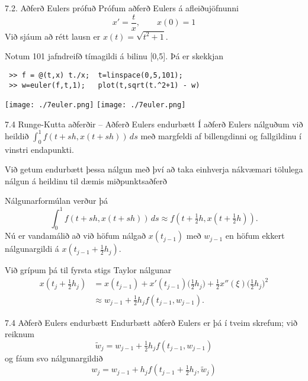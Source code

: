 \begin{frame}[fragile]{7.2. Aðferð Eulers prófuð}
Prófum aðferð Eulers á afleiðujöfnunni
$$
  x' = \frac tx, \qquad x(0) = 1
$$
Við sjáum að rétt lausn er $x(t) = \sqrt{t^2+ 1}$.\pause

Notum 101 jafndreifð tímagildi á bilinu [0,5]. Þá er skekkjan
 \begin{verbatim}
 >> f = @(t,x) t./x;  t=linspace(0,5,101);
 >> w=euler(f,t,1);   plot(t,sqrt(t.^2+1) - w)
 \end{verbatim}

{\texttt{[image: ./7euler.png]}}
{\texttt{[image: ./7euler.png]}}
\end{frame}


\begin{frame}{7.4 Runge-Kutta aðferðir  -- Aðferð Eulers endurbætt} 
Í aðferð Eulers nálguðum við heildið $\int_0^1 f(t+sh,x(t+sh))\, ds$
með margfeldi af billengdinni og fallgildinu í vinstri endapunkti.

\smallskip
Við getum endurbætt þessa nálgun með því að taka 
einhverja nákvæmari tölulega nálgun á heildinu til dæmis 
miðpunktsaðferð 

\pause
\smallskip
Nálgunarformúlan verður þá
$$
\int_0^1f(t+sh,x(t+sh))\, ds \approx f(t+\tfrac 12h,x(t+\tfrac 12 h)). 
$$
Nú er vandamálið að við höfum nálgað $x(t_{j-1})$ með $w_{j-1}$ en
höfum ekkert nálgunargildi á $x(t_{j-1}+\frac 12 h_j)$.  

\pause
\smallskip 
Við grípum þá til
fyrsta stigs Taylor nálgunar
\begin{align*}
x(t_j+\tfrac 12 h_j)&=x(t_{j-1})+x'(t_{j-1})\big(\tfrac 12 h_j \big)
+\tfrac 12x''(\xi)\big(\tfrac 12 h_j \big)^2\\
&\approx w_{j-1}+\tfrac 12 h_jf(t_{j-1},w_{j-1}).
\end{align*}
\end{frame}


\begin{frame}{7.4 Aðferð Eulers endurbætt} 
Endurbætt aðferð Eulers er þá í tveim skrefum; við
reiknum 
\begin{equation*}
  \tilde w_j = w_{j-1} + \tfrac 12 h_j f(t_{j-1},w_{j-1})
\end{equation*}
og fáum svo nálgunargildið
\begin{equation*}
  w_j = w_{j-1} + h_jf\left(
    t_{j-1}+\tfrac 12 h_j,\tilde w_j\right)
\end{equation*}
\end{frame}


